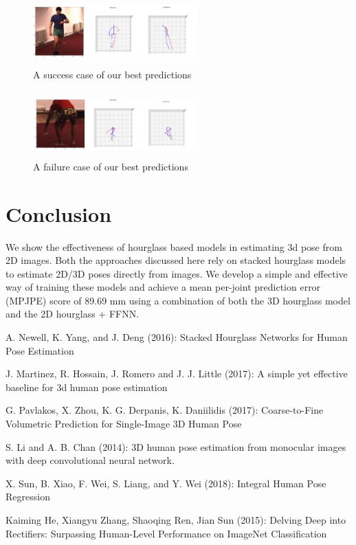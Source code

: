 \documentclass[sigconf]{acmart}
\begin{document}
\begin{figure}
\includegraphics[height=1in, width=2.5in]{img/success.png}
\caption{A success case of our best predictions}
\end{figure}

\begin{figure}
\includegraphics[height=1in, width=2.5in]{img/failure.png}
\caption{A failure case of our best predictions}
\end{figure}

\section{Conclusion}
\quad We show the effectiveness of hourglass based models in estimating 3d pose from 2D images. Both the approaches discussed here rely on stacked hourglass models to estimate 2D/3D poses directly from images. We develop a simple and effective way of training these models and achieve a mean per-joint prediction error (MPJPE) score of 89.69 mm using a combination of both the 3D hourglass model and the 2D hourglass + FFNN. 
\begin{thebibliography}{}
 
 A. Newell, K. Yang, and J. Deng (2016): Stacked Hourglass Networks for Human Pose Estimation

 J. Martinez, R. Hossain, J. Romero and J. J. Little (2017): A simple yet effective baseline for 3d human pose estimation

 G. Pavlakos, X. Zhou, K. G. Derpanis, K. Daniilidis (2017): Coarse-to-Fine Volumetric Prediction for Single-Image 3D Human Pose

 S. Li and A. B. Chan (2014): 3D human pose estimation from
monocular images with deep convolutional neural network.

 X. Sun, B. Xiao, F. Wei, S. Liang, and Y. Wei (2018): Integral Human Pose Regression

 Kaiming He, Xiangyu Zhang, Shaoqing Ren, Jian Sun (2015): Delving Deep into Rectifiers: Surpassing Human-Level Performance on ImageNet Classification

\end{thebibliography}
\newpage
\end{document}
